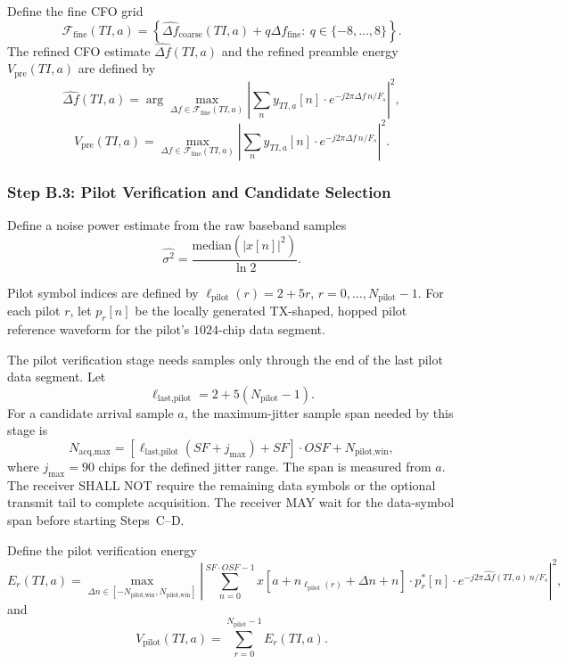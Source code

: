 \documentclass[11pt]{article}
\begin{document}
Define the fine CFO grid
\[
  \mathcal{F}_{\text{fine}}(\mathit{TI},a)=\left\{\widehat{\Delta f}_{\text{coarse}}(\mathit{TI},a)+q\Delta f_{\text{fine}}:\ q\in\{-8,\dots,8\}\right\}.
\]
The refined CFO estimate $\widehat{\Delta f}(\mathit{TI},a)$ and the refined preamble energy $V_{\text{pre}}(\mathit{TI},a)$ are defined by
\[
  \widehat{\Delta f}(\mathit{TI},a)=\arg\max_{\Delta f\in\mathcal{F}_{\text{fine}}(\mathit{TI},a)}\left|\sum_n y_{\mathit{TI},a}[n]\cdot e^{-j2\pi\Delta f\,n/F_s}\right|^2,
\]
\[
  V_{\text{pre}}(\mathit{TI},a)=\max_{\Delta f\in\mathcal{F}_{\text{fine}}(\mathit{TI},a)}\left|\sum_n y_{\mathit{TI},a}[n]\cdot e^{-j2\pi\Delta f\,n/F_s}\right|^2.
\]

\subsubsection{Step B.3: Pilot Verification and Candidate Selection}

Define a noise power estimate from the raw baseband samples
\[
  \widehat{\sigma^2} = \frac{\mathrm{median}(|x[n]|^2)}{\ln 2}.
\]

Pilot symbol indices are defined by $\ell_{\text{pilot}}(r)=2+5r$, $r=0,\dots,N_{\text{pilot}}-1$. For each pilot $r$, let $p_r[n]$ be the locally generated TX-shaped, hopped pilot reference waveform for the pilot's $1024$-chip data segment.

The pilot verification stage needs samples only through the end of the last pilot data segment. Let
\[
  \ell_{\text{last,pilot}}=2+5(N_{\text{pilot}}-1).
\]
For a candidate arrival sample $a$, the maximum-jitter sample span needed by this stage is
\[
  N_{\text{acq,max}}=\left[\ell_{\text{last,pilot}}(\mathit{SF}+j_{\max})+\mathit{SF}\right]\cdot\mathit{OSF}+N_{\text{pilot,win}},
\]
where $j_{\max}=90$ chips for the defined jitter range. The span is measured from $a$.
The receiver SHALL NOT require the remaining data symbols or the optional transmit tail to
complete acquisition. The receiver MAY wait for the data-symbol span before starting Steps~C--D.

Define the pilot verification energy
\[
  E_r(\mathit{TI},a)=\max_{\Delta n\in[-N_{\text{pilot,win}},N_{\text{pilot,win}}]}\left|\sum_{n=0}^{\mathit{SF}\cdot\mathit{OSF}-1} x\!\left[a+n_{\ell_{\text{pilot}}(r)}+\Delta n+n\right]\cdot p_r^*[n]\cdot e^{-j2\pi\widehat{\Delta f}(\mathit{TI},a)\,n/F_s}\right|^2,
\]
and
\[
  V_{\text{pilot}}(\mathit{TI},a)=\sum_{r=0}^{N_{\text{pilot}}-1}E_r(\mathit{TI},a).
\]
\end{document}
